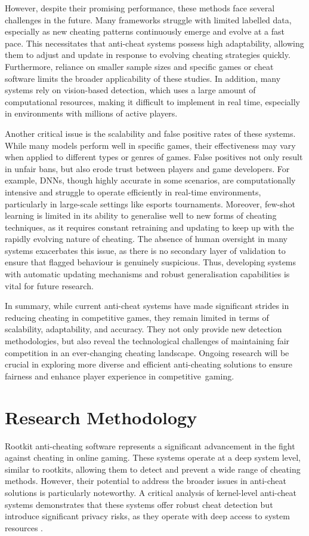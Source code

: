 \documentclass[a4paper, 12pt]{article}
\begin{document}
However, despite their promising performance, these methods face several challenges in the future. Many frameworks struggle with limited labelled data, especially as new cheating patterns continuously emerge and evolve at a fast pace. This necessitates that anti-cheat systems possess high adaptability, allowing them to adjust and update in response to evolving cheating strategies quickly. Furthermore, reliance on smaller sample sizes and specific games or cheat software limits the broader applicability of these studies. In addition, many systems rely on vision-based detection, which uses a large amount of computational resources, making it difficult to implement in real time, especially in environments with millions of active players.

Another critical issue is the scalability and false positive rates of these systems. While many models perform well in specific games, their effectiveness may vary when applied to different types or genres of games. False positives not only result in unfair bans, but also erode trust between players and game developers. For example, DNNs, though highly accurate in some scenarios, are computationally intensive and struggle to operate efficiently in real-time environments, particularly in large-scale settings like esports tournaments. Moreover, few-shot learning is limited in its ability to generalise well to new forms of cheating techniques, as it requires constant retraining and updating to keep up with the rapidly evolving nature of cheating. The absence of human oversight in many systems exacerbates this issue, as there is no secondary layer of validation to ensure that flagged behaviour is genuinely suspicious. Thus, developing systems with automatic updating mechanisms and robust generalisation capabilities is vital for future research.

In summary, while current anti-cheat systems have made significant strides in reducing cheating in competitive games, they remain limited in terms of scalability, adaptability, and accuracy. They not only provide new detection methodologies, but also reveal the technological challenges of maintaining fair competition in an ever-changing cheating landscape. Ongoing research will be crucial in exploring more diverse and efficient anti-cheating solutions to ensure fairness and enhance player experience in competitive gaming.

\section{Research Methodology}
Rootkit anti-cheating software represents a significant advancement in the fight against cheating in online gaming. These systems operate at a deep system level, similar to rootkits, allowing them to detect and prevent a wide range of cheating methods. However, their potential to address the broader issues in anti-cheat solutions is particularly noteworthy. A critical analysis of kernel-level anti-cheat systems demonstrates that these systems offer robust cheat detection but introduce significant privacy risks, as they operate with deep access to system resources \cite{dorner_2024_if}.
\end{document}
